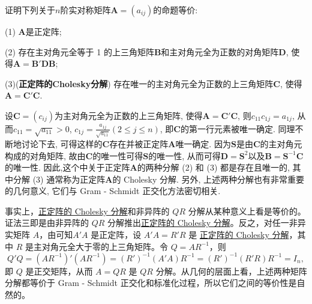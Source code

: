 \documentclass[../../main.tex]{subfiles}
\begin{document}
\begin{proposition}\label{proposition:正定阵的3个充要条件}
证明下列关于$n$阶实对称矩阵$\boldsymbol{A}=(a_{ij})$的命题等价:

(1) $\boldsymbol{A}$是正定阵;

(2) 存在主对角元全等于 1 的上三角矩阵$\boldsymbol{B}$和主对角元全为正数的对角矩阵$\boldsymbol{D}$, 使得$\boldsymbol{A}=\boldsymbol{B}'\boldsymbol{D}\boldsymbol{B}$;

(3)(\textbf{正定阵的Cholesky分解}) 存在唯一的主对角元全为正数的上三角矩阵$\boldsymbol{C}$, 使得$\boldsymbol{A}=\boldsymbol{C}'\boldsymbol{C}$.
\end{proposition}
\begin{remark}
设$\boldsymbol{C}=(c_{ij})$为主对角元全为正数的上三角矩阵, 使得$\boldsymbol{A}=\boldsymbol{C}'\boldsymbol{C}$, 则$c_{11}c_{1j}=a_{1j}$, 从而$c_{11}=\sqrt{a_{11}}>0$, $c_{1j}=\frac{a_{1j}}{\sqrt{a_{11}}}(2\leqslant  j\leqslant  n)$, 即$\boldsymbol{C}$的第一行元素被唯一确定. 同理不断地讨论下去, 可得这样的$\boldsymbol{C}$存在并被正定阵$\boldsymbol{A}$唯一确定. 因为$\boldsymbol{S}$是由$\boldsymbol{C}$的主对角元构成的对角矩阵, 故由$\boldsymbol{C}$的唯一性可得$\boldsymbol{S}$的唯一性, 从而可得$\boldsymbol{D}=\boldsymbol{S}^2$以及$\boldsymbol{B}=\boldsymbol{S}^{-1}\boldsymbol{C}$的唯一性. 因此,这个中关于正定阵$\boldsymbol{A}$的两种分解 (2) 和 (3) 都是存在且唯一的, 其中分解 (3) 通常称为正定阵$\boldsymbol{A}$的 Cholesky 分解. 另外, 上述两种分解也有非常重要的几何意义, 它们与 Gram - Schmidt 正交化方法密切相关. 
\end{remark}
\begin{remark}
事实上，\hyperref[proposition:正定阵的3个充要条件]{正定阵的 Cholesky 分解}和非异阵的 $QR$ 分解从某种意义上看是等价的。{\color{blue}证法三}即是由非异阵的 $QR$ 分解推出\hyperref[proposition:正定阵的3个充要条件]{正定阵的 Cholesky 分解}。反之，对任一非异实矩阵 $A$，由可知$A'A$ 是正定阵，设 $A'A = R'R$ 是 \hyperref[proposition:正定阵的3个充要条件]{正定阵的 Cholesky 分解}，其中 $R$ 是主对角元全大于零的上三角矩阵。令 $Q = AR^{-1}$，则
\[
Q'Q=(AR^{-1})'(AR^{-1})=(R')^{-1}(A'A)R^{-1}=(R')^{-1}(R'R)R^{-1}=I_n,
\]
即 $Q$ 是正交矩阵，从而 $A = QR$ 是 $QR$ 分解。从几何的层面上看，上述两种矩阵分解都等价于 Gram - Schmidt 正交化和标准化过程，所以它们之间的等价性是自然的。
\end{remark}
\end{document}

